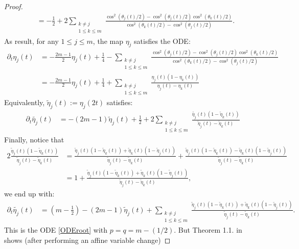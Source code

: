 \documentclass[12pt,reqno]{amsart}
\begin{document}
\begin{proof}
\begin{align*}
&= -\frac{1}{2}+ 2\sum_{\substack{k\neq j \\ 1 \leq k \leq m}}\frac{\cos^2(\theta_j(t)/2)-\cos^2(\theta_j(t)/2)\cos^2(\theta_k(t)/2)}{{\cos^2(\theta_k(t)/2)}-{\cos^2(\theta_j(t)/2)}}.
\end{align*}
As result, for any $1 \leq j \leq m$, the map $\eta_j$ satisfies the ODE:
\begin{align*}
\partial_t \eta_j(t) &= -\frac{2m-1}{2}\eta_j(t) + \frac{1}{4} -  \sum_{\substack{k\neq j \\ 1 \leq k \leq m}}
\frac{\cos^2(\theta_j(t)/2)-\cos^2(\theta_j(t)/2)\cos^2(\theta_k(t)/2)}{\cos^2(\theta_k(t)/2)-\cos^2(\theta_j(t)/2)} \\
&= -\frac{2m-1}{2}\eta_j(t) + \frac{1}{4}  + \sum_{\substack{k\neq j \\ 1 \leq k \leq m}} \frac{\eta_j(t)(1-\eta_k(t))}{\eta_j(t)-\eta_k(t)}
\end{align*}
Equivalently, $\tilde{\eta}_j(t) := \eta_j(2t)$ satisfies: 
\begin{align*}
\partial_t \tilde{\eta_j}(t) 
&=-(2m-1)\tilde{\eta}_j(t)  + \frac{1}{2} + 2 \sum_{\substack{k\neq j \\ 1 \leq k \leq m}} \frac{\tilde{\eta_j}(t)(1-\tilde{\eta}_k(t))}{\tilde{\eta}_j(t)-\tilde{\eta}_k(t)}
\end{align*}
Finally, notice that 
\begin{align*}
 2\frac{\tilde{\eta}_j(t)(1-\tilde{\eta}_k(t))}{\tilde{\eta}_j(t)-\tilde{\eta}_k(t)} &= 
 \frac{\tilde{\eta}_j(t)(1-\tilde{\eta}_k(t)) + \tilde{\eta}_k(t)(1-\tilde{\eta}_j(t))}{\tilde{\eta}_j(t)-\tilde{\eta}_k(t)} + 
 \frac{\tilde{\eta}_j(t)(1-\tilde{\eta}_k(t)) - \tilde{\eta}_k(t)(1-\tilde{\eta}_j(t))}{\tilde{\eta}_j(t)-\tilde{\eta}_k(t)} \\
 &= 1+ \frac{\tilde{\eta}_j(t)(1-\tilde{\eta}_k(t)) + \tilde{\eta}_k(t)(1-\tilde{\eta}_j(t))}{\tilde{\eta}_j(t)-\tilde{\eta}_k(t)},
\end{align*}
we end up with:
\begin{align*}
\partial_t \tilde{\eta_j}(t) 
&= \left(m-\frac{1}{2}\right)  -(2m-1)\tilde{\eta}_j(t) +
 \sum_{\substack{k\neq j \\ 1 \leq k \leq m}}\frac{\tilde{\eta}_j(t)(1-\tilde{\eta}_k(t)) + \tilde{\eta}_k(t)(1-\tilde{\eta}_j(t))}{\tilde{\eta}_j(t)-\tilde{\eta}_k(t)}. 
\end{align*}
This is the ODE \eqref{ODEroot} with $p=q = m- (1/2)$. But Theorem 1.1. in \cite{MR4751304} shows (after performing an affine variable change) 

\end{proof}
\end{document}
